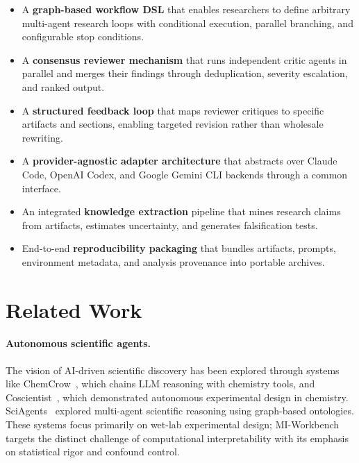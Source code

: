 \documentclass[10pt]{article}
\begin{document}
\begin{itemize}
  \item A \textbf{graph-based workflow DSL} that enables researchers to define arbitrary multi-agent research loops with conditional execution, parallel branching, and configurable stop conditions.
  \item A \textbf{consensus reviewer mechanism} that runs independent critic agents in parallel and merges their findings through deduplication, severity escalation, and ranked output.
  \item A \textbf{structured feedback loop} that maps reviewer critiques to specific artifacts and sections, enabling targeted revision rather than wholesale rewriting.
  \item A \textbf{provider-agnostic adapter architecture} that abstracts over Claude Code, OpenAI Codex, and Google Gemini CLI backends through a common interface.
  \item An integrated \textbf{knowledge extraction} pipeline that mines research claims from artifacts, estimates uncertainty, and generates falsification tests.
  \item End-to-end \textbf{reproducibility packaging} that bundles artifacts, prompts, environment metadata, and analysis provenance into portable archives.
\end{itemize}


\section{Related Work}
\label{sec:related}

\paragraph{Autonomous scientific agents.}
The vision of AI-driven scientific discovery has been explored through systems like ChemCrow~\citep{bran2024chemcrow}, which chains LLM reasoning with chemistry tools, and Coscientist~\citep{boiko2023autonomous}, which demonstrated autonomous experimental design in chemistry. SciAgents~\citep{ghafarollahi2024sciagents} explored multi-agent scientific reasoning using graph-based ontologies. These systems focus primarily on wet-lab experimental design; MI-Workbench targets the distinct challenge of computational interpretability with its emphasis on statistical rigor and confound control.
\end{document}
